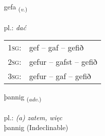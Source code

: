 \documentclass[frontgrid, backgrid]{flacards}\usepackage[]{graphicx}\usepackage[]{xcolor}
\begin{document}
\renewcommand{\flhead}{\vskip5pt \fboxsep=0pt {\small\bfseries\footnotesize Sagnorð | czasownik}}
\renewcommand{\fcfoot}{\vskip5pt \fboxsep=0pt \hspace{2pt}{\small\bfseries\footnotesize 1K}}

\renewcommand{\blhead}{\vskip5pt {\small\bfseries\footnotesize Sagnorð | czasownik }}
\renewcommand{\bcfoot}{\vskip5pt \hspace{2pt}{\small\bfseries\footnotesize 1K}}


{gefa \small{\textsubscript{(\textit{v.})}} \\[1ex] %
\textphonetic{[cɛːva]} \\
pl.: \emph{dać} \\  [2ex]
\renewcommand*{\arraystretch}{0.8}
\begin{tabular}{p{1cm}l}
\textsc{1sg}: & gef -- gaf -- gefið \\ 
\textsc{2sg}: & gefur -- gafst -- gefið \\ 
\textsc{3sg}: & gefur -- gaf -- gefið \\ 
\end{tabular}
}


\renewcommand{\flhead}{\vskip5pt \fboxsep=0pt {\small\bfseries\footnotesize Atviksorð | przysłówek}}
\renewcommand{\fcfoot}{\vskip5pt \fboxsep=0pt \hspace{2pt}{\small\bfseries\footnotesize 1K}}

\renewcommand{\blhead}{\vskip5pt {\small\bfseries\footnotesize Atviksorð | przysłówek }}
\renewcommand{\bcfoot}{\vskip5pt \hspace{2pt}{\small\bfseries\footnotesize 1K}}


{þannig \small{\textsubscript{(\textit{adv.})}} \\[1ex]
\textphonetic{[θanɪɣ]} \\
pl.: \emph{(a) zatem, więc} \\  [2ex]
þannig (Indeclinable)}

\renewcommand{\flhead}{\vskip5pt \fboxsep=0pt {\small\bfseries\footnotesize Sagnorð | czasownik}}
\renewcommand{\fcfoot}{\vskip5pt \fboxsep=0pt \hspace{2pt}{\small\bfseries\footnotesize 1K}}
\end{document}
